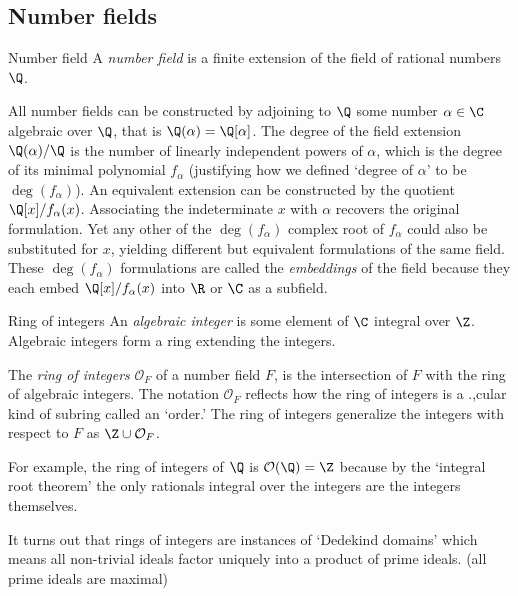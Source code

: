 \subsection{Number fields}

\begin{definition}{Number field}
    A \emph{number field} is a finite extension of the field of rational numbers $\Q$.
\end{definition}

All number fields can be constructed by adjoining to $\Q$ some number $\alpha\in\C$ algebraic over $\Q$, that is $\Q(\alpha)=\Q[\alpha]$.
The degree of the field extension $\Q(\alpha)/\Q$ is the number of linearly independent powers of $\alpha$, which is the degree of its minimal polynomial $f_\alpha$ (justifying how we defined `degree of $\alpha$' to be $\deg(f_\alpha)$).
An equivalent extension can be constructed by the quotient $\Q[x]/f_\alpha(x)$.
Associating the indeterminate $x$ with $\alpha$ recovers the original formulation.
Yet any other of the $\deg(f_\alpha)$ complex root of $f_\alpha$ could also be substituted for $x$, yielding different but equivalent formulations of the same field.
These $\deg(f_\alpha)$ formulations are called the \emph{embeddings} of the field because they each embed $\Q[x]/f_\alpha(x)$ into $\R$ or $\C$ as a subfield.

\begin{definition}{Ring of integers}
    An \emph{algebraic integer} is some element of $\C$ integral over $\Z$.
    Algebraic integers form a ring extending the integers.

    The \emph{ring of integers} $\mathcal{O}_F$ of a number field $F$, is the intersection of $F$ with the ring of algebraic integers. 
    The notation $\mathcal{O}_F$ reflects how the ring of integers is a .,cular kind of subring called an `order.'
    The ring of integers generalize the integers with respect to $F$ as $\Z\cup\mathcal{O}_F$.
\end{definition}

For example, the ring of integers of $\Q$ is $\mathcal{O}(\Q)=\Z$ because by the `integral root theorem' the only rationals integral over the integers are the integers themselves.

It turns out that rings of integers are instances of `Dedekind domains' which means all non-trivial ideals factor uniquely into a product of prime ideals.
(all prime ideals are maximal)








